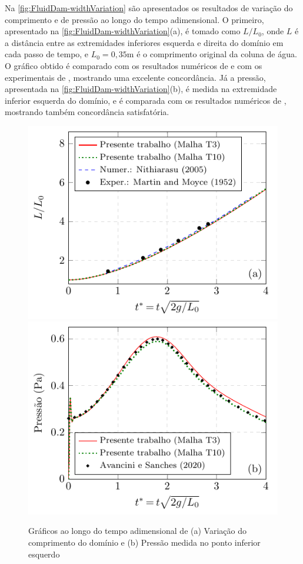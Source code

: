\documentclass[Tese.tex]{subfiles}
\begin{document}
Na \autoref{fig:FluidDam-widthVariation} são apresentados os resultados de variação do comprimento e de pressão ao longo do tempo adimensional. O primeiro, apresentado na \autoref{fig:FluidDam-widthVariation}(a), é tomado como $L/L_0$, onde $L$ é a distância entre as extremidades inferiores esquerda e direita do domínio em cada passo de tempo, e $L_0 = 0,35$m é o comprimento original da coluna de água. O gráfico obtido é comparado com os resultados numéricos de  e com os experimentais de , mostrando uma excelente concordância. Já a pressão, apresentada na \autoref{fig:FluidDam-widthVariation}(b), é medida na extremidade inferior esquerda do domínio, e é comparada com os resultados numéricos de , mostrando também concordância satisfatória.

\begin{figure}[!htb]
	\centering
	\caption{Gráficos ao longo do tempo adimensional de (a) Variação do comprimento do domínio e (b) Pressão medida no ponto inferior esquerdo}
	\label{fig:FluidDam-widthVariation}
	\includegraphics[scale=1.0]{Figuras/FluidDam/FluidDam-widthVariation.pdf}\;\;\includegraphics[scale=1.0]{Figuras/FluidDam/FluidDam-pressure.pdf}
\end{figure}
\end{document}
